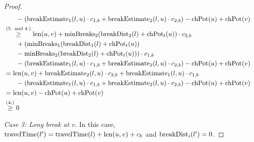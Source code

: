 \begin{proof}
\begin{align}
\begin{split}
			& \phantom{{}=1} - (\breakEstimate_1(l,u) \cdot \restr_{1,b} + \breakEstimate_2(l,u) \cdot \restr_{2,b}) - \chpotential(u) + \chpotential(v)\\
			&\stackrel{\text{(5. and 4.)}}{\ge} \len(u,v) + \minBreaks_2(\breakDist_2(l) + \chpotential_t(u)) \cdot \restr_{2,b}\\
			& \phantom{{}=1} + (\minBreaks_1(\breakDist_1(l) + \chpotential_t(u))\\
			& \phantom{{}=1} - \minBreaks_{2}(\breakDist_{2}(l) + \chpotential_t(u))) \cdot \restr_{1,b} \\
			& \phantom{{}=1} - (\breakEstimate_1(l,u) \cdot \restr_{1,b} + \breakEstimate_2(l,u) \cdot \restr_{2,b}) - \chpotential(u) + \chpotential(v)\\
			&= \len(u,v) + \breakEstimate_2(l,u) \cdot \restr_{2,b} + \breakEstimate_1(l,u) \cdot \restr_{1,b} \\
			& \phantom{{}=1} - (\breakEstimate_1(l,u) \cdot \restr_{1,b} + \breakEstimate_2(l,u) \cdot \restr_{2,b}) - \chpotential(u) + \chpotential(v)\\
			&= \len(u,v) - \chpotential(u) + \chpotential(v)\\
			&\stackrel{\text{(4.)}}{\ge} 0
		\end{split}
	\end{align}


	\emph{Case 3: Long break at $v$}. In this case, $\operatorname{travelTime}(l') = \operatorname{travelTime}(l) + \operatorname{len}(u,v) + c_b$ and $\operatorname{breakDist}_i(l') = 0$.


\end{proof}
